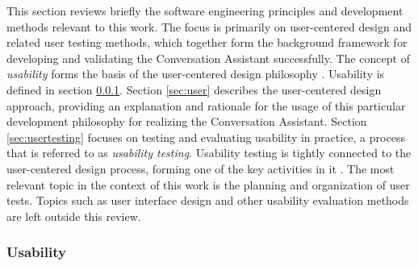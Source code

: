 \documentclass[english, 12pt, a4paper, pdftex, elec, utf8]{aaltothesis}
\begin{document}
This section reviews briefly the software engineering principles and development methods relevant to this work. The focus is primarily on user-centered design and related user testing methods, which together form the background framework for developing and validating the Conversation Assistant successfully. The concept of \textit{usability} forms the basis of the user-centered design philosophy \cite{richter2014user, deuff2013user}. Usability is defined in section \ref{sec:usability}. Section \ref{sec:user} describes the user-centered design approach, providing an explanation and rationale for the usage of this particular development philosophy for realizing the Conversation Assistant. Section \ref{sec:usertesting} focuses on testing and evaluating usability in practice, a process that is referred to as \textit{usability testing}. Usability testing is tightly connected to the user-centered design process, forming one of the key activities in it \cite{rubin2008handbook}. The most relevant topic in the context of this work is the planning and organization of user tests. Topics such as user interface design and other usability evaluation methods are left outside this review.

\subsubsection{Usability} \label{sec:usability}
\end{document}
